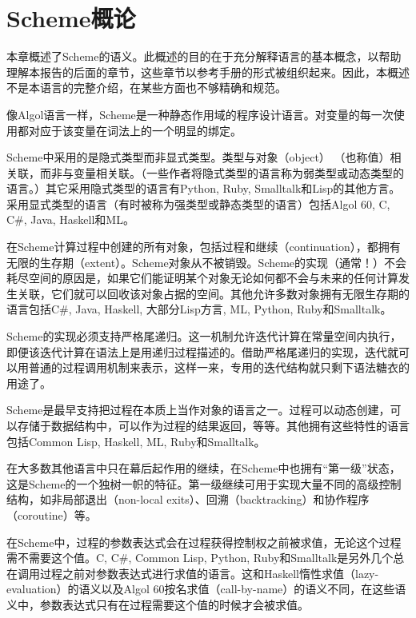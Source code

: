 \chapter{Scheme概论}
\label{semanticchapter}

本章概述了Scheme的语义。此概述的目的在于充分解释语言的基本概念，以帮助理解本报告的后面的章节，这些章节以参考手册的形式被组织起来。因此，本概述不是本语言的完整介绍，在某些方面也不够精确和规范。

\vest 像Algol语言一样，Scheme是一种静态作用域的程序设计语言。对变量的每一次使用都对应于该变量在词法上的一个明显的绑定。

\vest Scheme中采用的是隐式类型而非显式类型\cite{WaiteGoos}。类型与对象（object）
（也称值）相关联，而非与变量相关联。（一些作者将隐式类型的语言称为弱类型或动态类型的语言。）其它采用隐式类型的语言有Python, Ruby, Smalltalk和Lisp的其他方言。采用显式类型的语言（有时被称为强类型或静态类型的语言）包括Algol 60, C, C\#, Java, Haskell和ML。

\vest 在Scheme计算过程中创建的所有对象，包括过程和继续（continuation），都拥有无限的生存期（extent）。Scheme对象从不被销毁。Scheme的实现（通常！）不会耗尽空间的原因是，如果它们能证明某个对象无论如何都不会与未来的任何计算发生关联，它们就可以回收该对象占据的空间。其他允许多数对象拥有无限生存期的语言包括C\#, Java, Haskell, 大部分Lisp方言, ML, Python, Ruby和Smalltalk。

Scheme的实现必须支持严格尾递归。这一机制允许迭代计算在常量空间内执行，即便该迭代计算在语法上是用递归过程描述的。借助严格尾递归的实现，迭代就可以用普通的过程调用机制来表示，这样一来，专用的迭代结构就只剩下语法糖衣的用途了。


\vest Scheme是最早支持把过程在本质上当作对象的语言之一。过程可以动态创建，可以存储于数据结构中，可以作为过程的结果返回，等等。其他拥有这些特性的语言包括Common Lisp, Haskell, ML, Ruby和Smalltalk。

\vest 在大多数其他语言中只在幕后起作用的继续，在Scheme中也拥有“第一级”状态，这是Scheme的一个独树一帜的特征。第一级继续可用于实现大量不同的高级控制结构，如非局部退出（non-local exits）、回溯（backtracking）和协作程序（coroutine）等。

在Scheme中，过程的参数表达式会在过程获得控制权之前被求值，无论这个过程需不需要这个值。C, C\#, Common Lisp, Python, Ruby和Smalltalk是另外几个总在调用过程之前对参数表达式进行求值的语言。这和Haskell惰性求值（lazy-evaluation）的语义以及Algol 60按名求值（call-by-name）的语义不同，在这些语义中，参数表达式只有在过程需要这个值的时候才会被求值。

